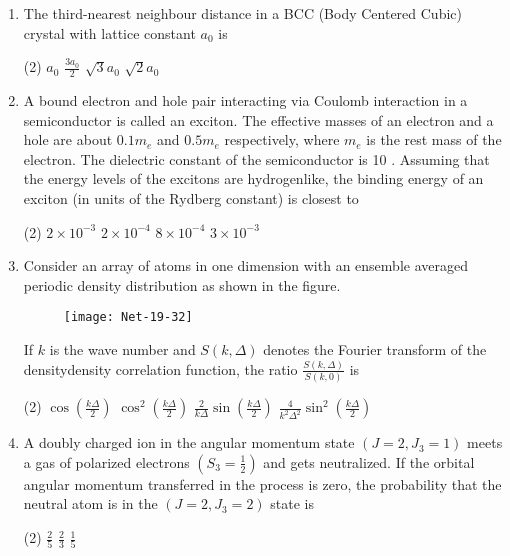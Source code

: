 \begin{enumerate}
\item The third-nearest neighbour distance in a BCC (Body Centered Cubic) crystal with lattice constant $a_{0}$ is
 \begin{tasks}(2)
	\task[\textbf{a.}] $a_{0}$
	\task[\textbf{b.}]$\frac{3 a_{0}}{2}$
	\task[\textbf{c.}] $\sqrt{3} a_{0}$
	\task[\textbf{d.}]  $\sqrt{2} a_{0}$
\end{tasks}
\item A bound electron and hole pair interacting via Coulomb interaction in a semiconductor is called an exciton. The effective masses of an electron and a hole are about $0.1 m_{e}$ and $0.5 m_{e}$ respectively, where $m_{e}$ is the rest mass of the electron. The dielectric constant of the semiconductor is 10 . Assuming that the energy levels of the excitons are hydrogenlike, the binding energy of an exciton (in units of the Rydberg constant) is closest to
 \begin{tasks}(2)
	\task[\textbf{a.}]$2 \times 10^{-3}$
	\task[\textbf{b.}]$2 \times 10^{-4}$
	\task[\textbf{c.}]$8 \times 10^{-4}$
	\task[\textbf{d.}]$3 \times 10^{-3}$ 
\end{tasks}
\item Consider an array of atoms in one dimension with an ensemble averaged periodic density distribution as shown in the figure.
\begin{figure}[H]
	\centering
	\texttt{[image: Net-19-32]}
\end{figure}
If $k$ is the wave number and $S(k, \Delta)$ denotes the Fourier transform of the densitydensity correlation function, the ratio $\frac{S(k, \Delta)}{S(k, 0)}$ is
 \begin{tasks}(2)
	\task[\textbf{a.}] $\cos \left(\frac{k \Delta}{2}\right)$
	\task[\textbf{b.}] $\cos ^{2}\left(\frac{k \Delta}{2}\right)$
	\task[\textbf{c.}] $\frac{2}{k \Delta} \sin \left(\frac{k \Delta}{2}\right)$
	\task[\textbf{d.}] $\frac{4}{k^{2} \Delta^{2}} \sin ^{2}\left(\frac{k \Delta}{2}\right)$
\end{tasks}
\item A doubly charged ion in the angular momentum state $\left(J=2, J_{3}=1\right)$ meets a gas of polarized electrons $\left(S_{3}=\frac{1}{2}\right)$ and gets neutralized. If the orbital angular momentum transferred in the process is zero, the probability that the neutral atom is in the $\left(J=2, J_{3}=2\right)$ state is
 \begin{tasks}(2)
	\task[\textbf{a.}] $\frac{2}{5}$
	\task[\textbf{b.}]$\frac{2}{3}$
	\task[\textbf{c.}]$\frac{1}{5}$

\end{tasks}
\end{enumerate}
